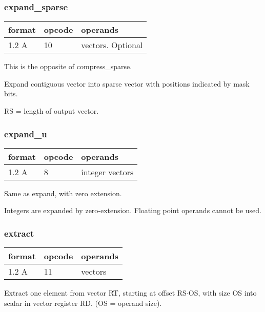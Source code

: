 \documentclass[forwardcom.tex]{subfiles}
\begin{document}
\subsubsection{expand\_sparse}
\label{table:expandSparseInstruction}
\begin{tabular}{|p{12mm}|p{12mm}|p{110mm}|}
\hline
\bfseries format & \bfseries opcode & \bfseries operands \\ \hline
1.2 A & 10 & vectors. Optional \\ \hline
\end{tabular}
\vspace{2mm}

This is the opposite of compress\_sparse.

Expand contiguous vector into sparse vector
with positions indicated by mask bits. 

RS = length of output vector.

\subsubsection{expand\_u}
\label{table:expandUsInstruction}
\begin{tabular}{|p{12mm}|p{12mm}|p{110mm}|}
\hline
\bfseries format & \bfseries opcode & \bfseries operands \\ \hline
1.2 A & 8 & integer vectors  \\ \hline
\end{tabular}
\vspace{2mm}

Same as expand, with zero extension.
\vspace{2mm}

Integers are expanded by zero-extension. Floating point operands cannot be used. 

\subsubsection{extract}
\label{table:extractInstruction}
\begin{tabular}{|p{12mm}|p{12mm}|p{110mm}|}
\hline
\bfseries format & \bfseries opcode & \bfseries operands \\ \hline
1.2 A & 11 & vectors  \\ \hline
\end{tabular}
\vspace{2mm}

Extract one element from vector RT, starting at offset RS$\cdot$OS, with size OS into scalar in vector register RD. (OS = operand size).
\vspace{2mm}
\end{document}
